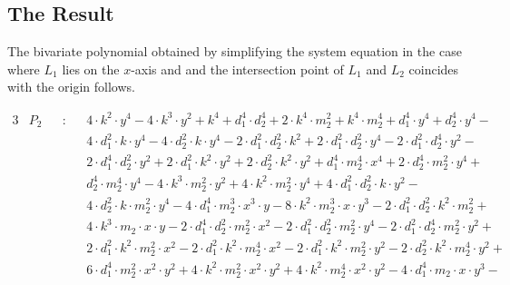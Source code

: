 \subsection{The Result}
\label{ssec:derivation-p2}
The bivariate polynomial obtained by simplifying the system equation in the case where $L_1$ lies on the $x$-axis and and the intersection point of $L_1$ and $L_2$ coincides with the origin follows.

\begin{alignat*}{3}
  & P_2 && : && 4 \cdot k^2 \cdot y^4
    - 4 \cdot k^3 \cdot y^2
    + k^4 + d_1^4 \cdot d_2^4
    + 2 \cdot k^4 \cdot m_2^2
    + k^4 \cdot m_2^4
    + d_1^4 \cdot y^4
    + d_2^4 \cdot y^4 -\\
  & && && 4 \cdot d_1^2 \cdot k \cdot y^4
    - 4 \cdot d_2^2 \cdot k \cdot y^4
    - 2 \cdot d_1^2 \cdot d_2^2 \cdot k^2
    + 2 \cdot d_1^2 \cdot d_2^2 \cdot y^4
    - 2 \cdot d_1^2 \cdot d_2^4 \cdot y^2 -\\
  & && && 2 \cdot d_1^4 \cdot d_2^2 \cdot y^2
    + 2 \cdot d_1^2 \cdot k^2 \cdot y^2
    + 2 \cdot d_2^2 \cdot k^2 \cdot y^2
    + d_1^4 \cdot m_2^4 \cdot x^4
    + 2 \cdot d_2^4 \cdot m_2^2 \cdot y^4 +\\
  & && && d_2^4 \cdot m_2^4 \cdot y^4
    - 4 \cdot k^3 \cdot m_2^2 \cdot y^2
    + 4 \cdot k^2 \cdot m_2^2 \cdot y^4
    + 4 \cdot d_1^2 \cdot d_2^2 \cdot k \cdot y^2 - \\
  & && && 4 \cdot d_2^2 \cdot k \cdot m_2^2 \cdot y^4
    - 4 \cdot d_1^4 \cdot m_2^3 \cdot x^3 \cdot y
    - 8 \cdot k^2 \cdot m_2^3 \cdot x \cdot y^3
    - 2 \cdot d_1^2 \cdot d_2^2 \cdot k^2 \cdot m_2^2 +\\
  & && && 4 \cdot k^3 \cdot m_2 \cdot x \cdot y
    - 2 \cdot d_1^4 \cdot d_2^2 \cdot m_2^2 \cdot x^2
    - 2 \cdot d_1^2 \cdot d_2^2 \cdot m_2^2 \cdot y^4
    - 2 \cdot d_1^2 \cdot d_2^4 \cdot m_2^2 \cdot y^2+\\
  & && && 2 \cdot d_1^2 \cdot k^2 \cdot m_2^2 \cdot x^2
    - 2 \cdot d_1^2 \cdot k^2 \cdot m_2^4 \cdot x^2
    - 2 \cdot d_1^2 \cdot k^2 \cdot m_2^2 \cdot y^2
    - 2 \cdot d_2^2 \cdot k^2 \cdot m_2^4 \cdot y^2 +\\
  & && && 6 \cdot d_1^4 \cdot m_2^2 \cdot x^2 \cdot y^2
    + 4 \cdot k^2 \cdot m_2^2 \cdot x^2 \cdot y^2
    + 4 \cdot k^2 \cdot m_2^4 \cdot x^2 \cdot y^2
    - 4 \cdot d_1^4 \cdot m_2 \cdot x \cdot y^3 -\\

\end{alignat*}
